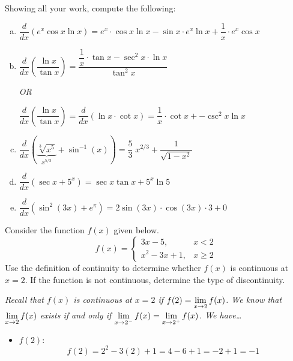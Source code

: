 \documentclass[12pt,letterpaper]{exam}
\begin{document}
\begin{questions}
\newpage
\question[20] Showing all your work, compute the following: \par\vspace{0.5cm}
	\begin{enumerate}[(a)]
	\item $\dfrac{d}{dx} \left(e^x \cos x \ln x \right)= e^x \cdot \cos x \ln x - \sin x \cdot e^x \ln x + \dfrac{1}{x} \cdot e^x \cos x$ \vfill
	\item $\dfrac{d}{dx} \left( \dfrac{\ln x}{\tan x} \right)= \dfrac{\dfrac{1}{x} \cdot \tan x - \sec^2 x \cdot \ln x}{\tan^2 x}$ \par\vspace{0.5cm}
	
	\hspace{3cm} {\itshape OR} \par\vspace{0.5cm}
	
	$\dfrac{d}{dx} \left( \dfrac{\ln x}{\tan x} \right)= \dfrac{d}{dx} (\ln x \cdot \cot x)= \dfrac{1}{x} \cdot \cot x + -\csc^2 x \ln x$ \par\vspace{0.65cm}
	
	\item $\dfrac{d}{dx} \left( \underbrace{\sqrt[3]{x^5}}_{x^{5/3}} + \sin^{-1}(x) \right)= \dfrac{5}{3}\; x^{2/3} + \dfrac{1}{\sqrt{1 - x^2}}$ \vfill
	\item $\dfrac{d}{dx} \left( \sec x + 5^x \right)= \sec x \tan x + 5^x \ln 5$ \vfill
	\item $\dfrac{d}{dx} \left( \sin^2(3x) + e^\pi \right)= 2 \sin(3x) \cdot \cos(3x) \cdot 3 + 0$ \vfill
	\end{enumerate}



\newpage
\question[20] Consider the function $f(x)$ given below.
	\[
	f(x)= 
	\begin{cases}
	3x - 5, & x < 2 \\
	x^2 - 3x + 1, & x \geq 2
	\end{cases}
	\]
Use the definition of continuity to determine whether $f(x)$ is continuous at $x= 2$. If the function is not continuous, determine the type of discontinuity. \pspace

{\itshape \tsol Recall that $f(x)$ is continuous at $x= 2$ if $\displaystyle f(2)= \lim_{x \to 2} f(x)$. We know that $\displaystyle\lim_{x \to 2} f(x)$ exists if and only if $\displaystyle\lim_{x \to 2^-} f(x)= \lim_{x \to 2^+} f(x)$. We have\dots
	\begin{itemize}
	\item $f(2)$: 
		\[
		f(2)= 2^2 - 3(2) + 1= 4 - 6 + 1= -2 + 1= -1
		\] \par\vspace{0.5cm}
	

\end{itemize}}
\end{questions}
\end{document}
